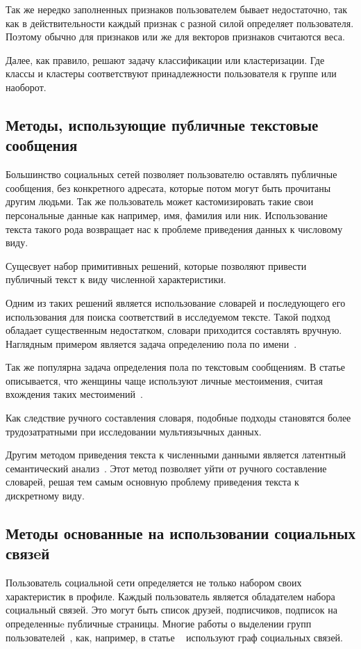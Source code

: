 \documentclass[annotation,times,page4]{itmo-student-thesis}
\begin{document}
Так же нередко заполненных признаков пользователем бывает недостаточно, так как в действительности каждый признак с разной силой определяет пользователя. Поэтому обычно для признаков или же для векторов признаков считаются веса. 

Далее, как правило, решают задачу классификации или кластеризации. Где классы и кластеры соответствуют принадлежности пользователя к группе или наоборот.
\subsection{Методы, использующие публичные текстовые сообщения}
Большинство социальных сетей позволяет пользователю оставлять публичные сообщения, без конкретного адресата, которые потом могут быть прочитаны другим людьми. Так же пользователь может кастомизировать такие свои персональные данные как например, имя, фамилия или ник. Использование текста такого рода возвращает нас к проблеме приведения данных к числовому виду.
 
Сущесвует набор примитивных решений, которые позволяют привести публичный текст к виду численной характеристики. 

Одним из таких решений является использование словарей и последующего его использования для поиска соответствий в исследуемом тексте. Такой подход обладает существенным недостатком, словари приходится составлять вручную. Наглядным примером является задача определению пола по имени~\cite{sloan2013knowing}. 

Так же популярна задача определения пола по текстовым сообщениям. В статье описывается, что женщины чаще используют личные местоимения, считая вхождения таких местоимений~\cite{pennebaker2011your}.

Как следствие ручного составления словаря, подобные подходы становятся более трудозатратными при исследовании мультиязычных данных.

Другим методом приведения текста к численными данными является латентный семантический анализ~\cite{farseev2015harvesting}. Этот метод позволяет уйти от ручного составление словарей, решая тем самым основную проблему приведения текста к дискретному виду.
  
\subsection{Методы основанные на использовании социальных связeй}
Пользователь социальной сети определяется не только набором своих характеристик в профиле. Каждый пользователь является обладателем набора социальный связей. Это могут быть список друзей, подписчиков, подписок на определенныe публичные страницы. Многие работы о выделении групп пользователей~\cite{trusov2010determining}, как, например, в статье ~\cite{barbera2015tweeting} используют граф социальных связей.
\end{document}

